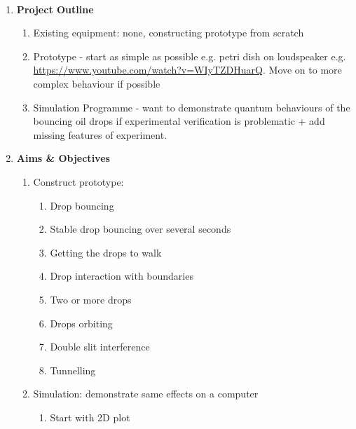 \noindent 
\\
\begin{enumerate}
\item  \textbf{Project Outline}

\begin{enumerate}
\item Existing equipment: none, constructing prototype from scratch

\item  Prototype - start as simple as possible e.g. petri dish on loudspeaker e.g. \url{https://www.youtube.com/watch?v=WIyTZDHuarQ}.  Move on to more complex behaviour if possible

\item  Simulation Programme - want to demonstrate quantum behaviours of the bouncing oil drops if experimental verification is problematic + add missing features of experiment.\\
\end{enumerate}

\item  \textbf{Aims \& Objectives}

\begin{enumerate}
\item Construct prototype:

\begin{enumerate}
\item  Drop bouncing

\item  Stable drop bouncing over several seconds

\item  Getting the drops to walk

\item  Drop interaction with boundaries

\item  Two or more drops

\item  Drops orbiting

\item  Double slit interference

\item  Tunnelling
\end{enumerate}

\item  Simulation: demonstrate same effects on a computer

\begin{enumerate}
\item  Start with 2D plot


\end{enumerate}
\end{enumerate}
\end{enumerate}
